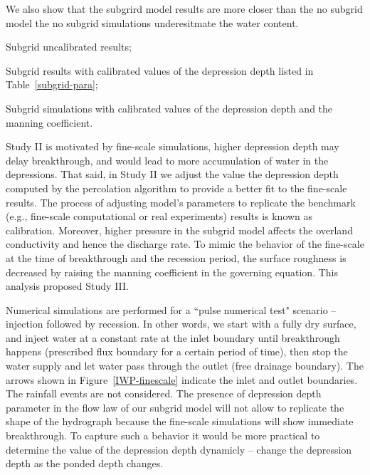 \documentclass[review,11pt]{elsarticle}
\begin{document}
We also show that the subgrird model results are more closer than the no subgrid model the no subgrid simulations underesitmate the water content. 
\begin{description}\itemsep0pt \parskip0pt
\item [Study I:] Subgrid uncalibrated results;
\item [Study II:] Subgrid results with calibrated values of the depression depth listed in Table~\ref{subgrid-para};
\item [Study III:] Subgrid simulations with calibrated values of the depression depth and the manning coefficient.
\end{description}

Study II is motivated by fine-scale simulations, higher depression depth may delay breakthrough, and would lead to more accumulation of water in the depressions. That said, in Study II we adjust the value the depression depth computed by the percolation algorithm to provide a better fit to the fine-scale results. The process of adjusting model's parameters to replicate the benchmark (e.g., fine-scale computational or real experiments) results is known as calibration. Moreover, higher pressure in the subgrid model affects the overland conductivity and hence the discharge rate. To mimic the behavior of the fine-scale at the time of breakthrough and the recession period, the surface roughness is decreased by raising the manning coefficient in the governing equation. This analysis proposed Study III.

Numerical simulations are performed for a  ``pulse numerical test" scenario -- injection followed by recession. In other words, we start with a fully dry surface, and inject water at a constant rate at the inlet boundary until breakthrough happens (prescribed flux boundary for a certain period of time), then stop the water supply and let water pass through the outlet (free drainage boundary). The arrows shown in Figure~\ref{IWP-finescale} indicate the inlet and outlet boundaries. The rainfall events are not considered. The presence of depression depth parameter in the flow law of our subgrid model will not allow to replicate the shape of the hydrograph because the fine-scale simulations will show immediate breakthrough. To capture such a behavior it would be more practical to determine the value of the depression depth dynamicly -- change the depression depth as the ponded depth changes.
\end{document}
